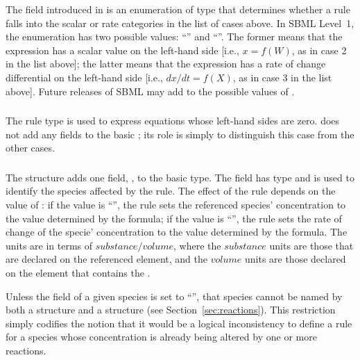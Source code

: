 \documentclass[10pt]{cekarticle}
\newcommand{\changed}[1]{\textcolor{BrickRed}{#1}}
\newenvironment{blockChanged}{\color{BrickRed}}{}
\begin{document}
The  field introduced in  is an
enumeration of type  that determines whether a rule falls
into the \changed{scalar or rate categories} in the list of cases above.
In SBML Level~1, the enumeration has two possible values:
``'' and ``''.  The former means that the
expression has a scalar value on the left-hand side \changed{[i.e., $x =
  f(W)$}, as in case 2 in the list above]; the latter means that the
expression has a rate of change differential on the left-hand side
\changed{[i.e., $dx/dt = f(X)$, as in case 3 in the list above]}.  Future
releases of SBML may add to the possible values of .


\subsubsection{}

The rule type  is used to express equations whose
left-hand sides are zero.   does not add any fields to
the basic ; its role is simply to distinguish this case from
the other cases.


\subsubsection{}

The  structure adds one field,
\changed{}, to the basic  type.  The
field \changed{} has type  and is used to
identify the \changed{species} affected by the rule.  The effect of the
rule depends on the value of : if the value is
``'', the rule sets the referenced \changed{species}'
concentration to the value determined by the formula; if the value is
``'', the rule sets the rate of change of the \changed{specie}'
concentration to the value determined by the formula.  The units are in
terms of $substance/volume$, where the $substance$ units are those that are
declared on the referenced  element, and the $volume$ units
are those declared on the  element that contains the
.

\begin{blockChanged}
  Unless the  field of a given species is set to
  ``'', that species cannot be named by both a
   structure and a 
  structure (see Section~\ref{sec:reactions}).  This restriction simply
  codifies the notion that it would be a logical inconsistency to define a
  rule for a species whose concentration is already being altered by one or
  more reactions.
\end{blockChanged}
\end{document}
